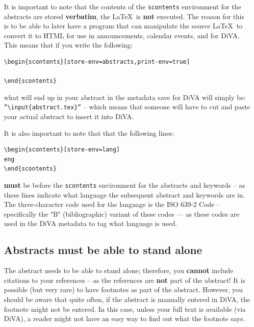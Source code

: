 \documentclass[main.tex]{subfiles}
\begin{document}
It is important to note that the contents of the \texttt{scontents} environment for the abstracts are stored \textbf{verbatim}, \ie the \LaTeX\  is \textbf{not} executed. The reason for this is to be able to later have a program that can manipulate the source \LaTeX\  to convert it to HTML for use in announcements, calendar events, and for DiVA. This means that if you write the following:
\begin{lstlisting}[style=latexExampleForAuthors]
\begin{scontents}[store-env=abstracts,print-env=true]

\end{scontents}
\end{lstlisting}
\noindent what will end up in your abstract in the metadata save for DiVA will simply be: \texttt{''\textbackslash input\{abstract.tex\}''} -- which means that someone will have to cut and paste your actual abstract to insert it into DiVA.

It is also important to note that that the following lines:
\begin{lstlisting}[style=latexExampleForAuthors]
\begin{scontents}[store-env=lang]
eng
\end{scontents}
\end{lstlisting}
\noindent \textbf{must} be before the \texttt{scontents} environment for the abstracts and keywords -- as these lines indicate what language the subsequent abstract and keywords are in. The three-character code used for the language is the ISO 639-2 Code – specifically the "B" (bibliographic) variant of these codes --- as these codes are used in the DiVA metadata to tag what language is used.

\subsection{Abstracts must be able to stand alone}
\label{sec:standaloneAbstract}

The abstract needs to be able to stand alone; therefore, you \textbf{cannot} include citations to your references -- as the references are \textbf{not} part of the abstract! It is possible (but very rare) to have footnotes as part of the abstract. However, you should be aware that quite often, if the abstract is manually entered in DiVA, the footnote might not be entered. In this case, unless your full text is available (\eg via DiVA), a reader might not have an easy way to find out what the footnote says.
\end{document}
